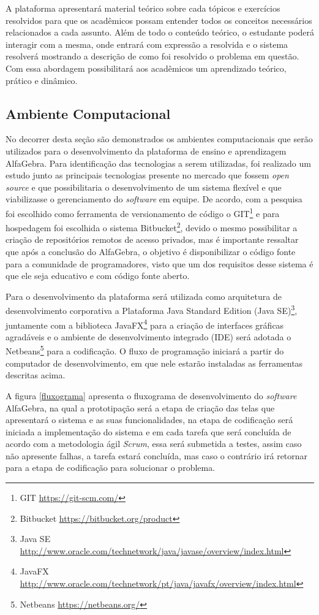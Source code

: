 A plataforma apresentará material teórico sobre cada tópicos e exercícios resolvidos para que os acadêmicos possam entender todos os conceitos necessários relacionados a cada assunto. Além de todo o conteúdo teórico, o estudante poderá interagir com a mesma, onde entrará com expressão a resolvida e o sistema resolverá mostrando a descrição de como foi resolvido o problema em questão. Com essa abordagem possibilitará aos acadêmicos um aprendizado teórico, prático e dinâmico.

\subsection{Ambiente Computacional}
\noindent No decorrer desta seção são demonstrados os ambientes computacionais que serão utilizados para o desenvolvimento da plataforma de ensino e aprendizagem AlfaGebra. Para identificação das tecnologias a serem utilizadas, foi realizado um estudo junto as principais tecnologias presente no mercado que fossem \textit{open source} e que possibilitaria o desenvolvimento de um sistema flexível e que viabilizasse o gerenciamento do \textit{software} em equipe. De acordo, com a pesquisa foi escolhido como ferramenta de versionamento de código o GIT\footnote[6]{GIT \url{https://git-scm.com/}} e para hospedagem foi escolhida o sistema Bitbucket\footnote[7]{Bitbucket \url{https://bitbucket.org/product}}, devido o mesmo possibilitar a criação de repositórios remotos de acesso privados, mas é importante ressaltar que após a conclusão do AlfaGebra, o objetivo é disponibilizar o código fonte para a comunidade de programadores, visto que um dos requisitos desse sistema é que ele seja educativo e com código fonte aberto.

Para o desenvolvimento da plataforma será utilizada como arquitetura de desenvolvimento corporativa a {Plataforma Java Standard Edition} (Java SE)\footnote[8]{Java SE \url{http://www.oracle.com/technetwork/java/javase/overview/index.html}}, juntamente com a biblioteca JavaFX\footnote[9]{JavaFX \url{http://www.oracle.com/technetwork/pt/java/javafx/overview/index.html}} para a criação de interfaces gráficas agradáveis e o ambiente de desenvolvimento integrado (IDE) será adotada o Netbeans\footnote[10]{Netbeans \url{https://netbeans.org/}} para a codificação. O fluxo de programação iniciará a partir do computador de desenvolvimento, em que nele estarão instaladas as ferramentas descritas acima.

A figura \ref{fluxograma} apresenta o fluxograma de desenvolvimento do \textit{software} AlfaGebra, na qual a prototipação será a etapa de criação das telas que apresentará o sistema e as suas funcionalidades, na etapa de codificação será iniciada a implementação do sistema e em cada tarefa que será concluída de acordo com a metodologia ágil \textit{Scrum}, essa será submetida a testes, assim caso não apresente falhas, a tarefa estará concluída, mas caso o contrário irá retornar para a etapa de codificação para solucionar o problema.

